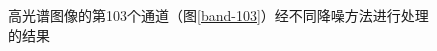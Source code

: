 \documentclass[12pt, a4paper]{article}
\begin{document}
\begin{figure}[htbp]
\caption{高光谱图像的第103个通道（图\ref{band-103}）经不同降噪方法进行处理的结果}
\label{bands-103}
\end{figure}
	
\end{document}
